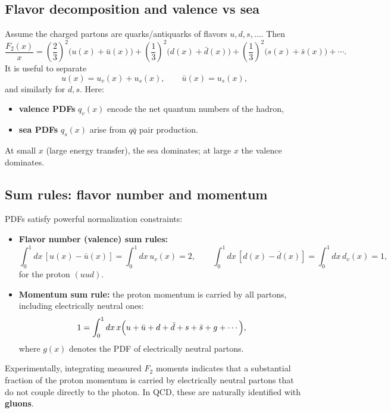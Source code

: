 \subsection{Flavor decomposition and valence vs sea}
Assume the charged partons are quarks/antiquarks of flavors $u,d,s,\dots$. Then
\begin{equation}
\frac{F_2(x)}{x}
=\left(\frac{2}{3}\right)^2\bigl(u(x)+\bar u(x)\bigr)
+\left(\frac{1}{3}\right)^2\bigl(d(x)+\bar d(x)\bigr)
+\left(\frac{1}{3}\right)^2\bigl(s(x)+\bar s(x)\bigr)+\cdots .
\end{equation}
It is useful to separate
\begin{equation}
u(x)=u_v(x)+u_s(x),\qquad \bar u(x)=u_s(x),
\end{equation}
and similarly for $d,s$. Here:
\begin{itemize}
  \item \textbf{valence PDFs} $q_v(x)$ encode the net quantum numbers of the hadron,
  \item \textbf{sea PDFs} $q_s(x)$ arise from $q\bar q$ pair production.
\end{itemize}
At small $x$ (large energy transfer), the sea dominates; at large $x$ the valence dominates.

\subsection{Sum rules: flavor number and momentum}
PDFs satisfy powerful normalization constraints:
\begin{itemize}
  \item \textbf{Flavor number (valence) sum rules:}
  \begin{equation}
  \int_0^1 dx\,[u(x)-\bar u(x)] = \int_0^1 dx\,u_v(x) = 2,\qquad
  \int_0^1 dx\,[d(x)-\bar d(x)] = \int_0^1 dx\,d_v(x) = 1,
  \end{equation}
  for the proton $(uud)$.
  \item \textbf{Momentum sum rule:} the proton momentum is carried by all partons,
  including electrically neutral ones:
  \begin{equation}
  1=\int_0^1 dx\,x\Bigl(u+\bar u+d+\bar d+s+\bar s+g+\cdots\Bigr),
  \end{equation}
  where $g(x)$ denotes the PDF of electrically neutral partons.
\end{itemize}
Experimentally, integrating measured $F_2$ moments indicates that a substantial fraction of
the proton momentum is carried by electrically neutral partons that do not couple directly to the
photon. In QCD, these are naturally identified with \textbf{gluons}.

